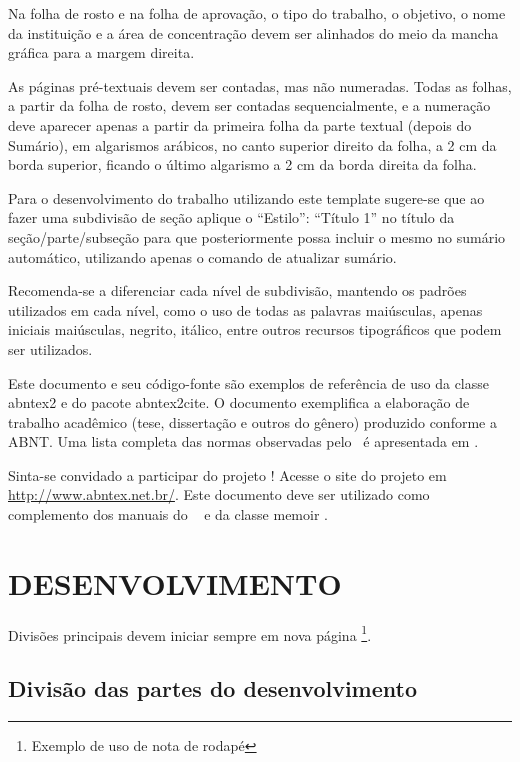 \documentclass[
	12pt,				%
	openright,			%
	oneside,			%
	a4paper,			%
	english,			%
	french,				%
	spanish,			%
	brazil				%
	]{abntex2UFMT}
\begin{document}
Na folha de rosto e na folha de aprovação, o tipo do trabalho, o objetivo, o nome da instituição e a área de concentração devem ser alinhados do meio da mancha gráfica para a margem direita.

As páginas pré-textuais devem ser contadas, mas não numeradas. Todas as folhas, a partir da folha de rosto, devem ser contadas sequencialmente, e a numeração deve aparecer apenas a partir da primeira folha da parte textual (depois do Sumário), em algarismos arábicos, no canto superior direito da folha, a 2 cm da borda superior, ficando o último algarismo a 2 cm da borda direita da folha.

Para o desenvolvimento do trabalho utilizando este template sugere-se que ao fazer uma subdivisão de seção aplique o “Estilo”: “Título 1” no título da seção/parte/subseção para que posteriormente possa incluir o mesmo no sumário automático, utilizando apenas o comando de atualizar sumário.

Recomenda-se a diferenciar cada nível de subdivisão, mantendo os padrões utilizados em cada nível, como o uso de todas as palavras maiúsculas, apenas iniciais maiúsculas, negrito, itálico, entre outros recursos tipográficos que podem ser utilizados.

Este documento e seu código-fonte são exemplos de referência de uso da classe
\textsf{abntex2} e do pacote \textsf{abntex2cite}. O documento 
exemplifica a elaboração de trabalho acadêmico (tese, dissertação e outros do
gênero) produzido conforme a ABNT. Uma lista completa das normas
observadas pelo \abnTeX\ é apresentada em .

Sinta-se convidado a participar do projeto \abnTeX! Acesse o site do projeto em
\url{http://www.abntex.net.br/}. Este documento deve ser utilizado como complemento dos manuais do \abnTeX\ 
\cite{abntex2classe,abntex2cite,abntex2cite-alf} e da classe \textsf{memoir}
\cite{memoir}. 



\chapter{DESENVOLVIMENTO}\label{DESENVOLVIMENTO}
Divisões principais devem iniciar sempre em nova página \footnote{Exemplo de uso de nota de rodapé}.

\section{Divisão das partes do desenvolvimento}
\end{document}
